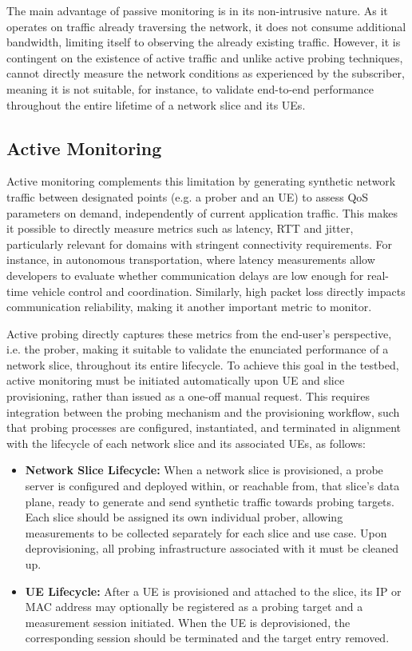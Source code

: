 The main advantage of passive monitoring is in its non-intrusive nature. As it operates on traffic already traversing the network, it does not consume additional bandwidth, limiting itself to observing the already existing traffic. However, it is contingent on the existence of active traffic and unlike active probing techniques, cannot directly measure the network conditions as experienced by the subscriber, meaning it is not suitable, for instance, to validate end-to-end performance throughout the entire lifetime of a network slice and its \acsp{UE}.

\subsection{Active Monitoring}
\label{chap:proposal:observability:activemonitoring}

Active monitoring complements this limitation by generating synthetic network traffic between designated points (e.g. a prober and an \acs{UE}) to assess \acs{QoS} parameters on demand, independently of current application traffic. This makes it possible to directly measure metrics such as latency, \acs{RTT} and jitter, particularly relevant for domains with stringent connectivity requirements. For instance, in autonomous transportation, where latency measurements allow developers to evaluate whether communication delays are low enough for real-time vehicle control and coordination. Similarly, high packet loss directly impacts communication reliability, making it another important metric to monitor.

Active probing directly captures these metrics from the end-user's perspective, i.e. the prober, making it suitable to validate the enunciated performance of a network slice, throughout its entire lifecycle. To achieve this goal in the testbed, active monitoring must be initiated automatically upon \acs{UE} and slice provisioning, rather than issued as a one-off manual request. This requires integration between the probing mechanism and the provisioning workflow, such that probing processes are configured, instantiated, and terminated in alignment with the lifecycle of each network slice and its associated \acsp{UE}, as follows:

\begin{itemize}
    \item \textbf{Network Slice Lifecycle:} When a network slice is provisioned, a probe server is configured and deployed within, or reachable from, that slice's data plane, ready to generate and send synthetic traffic towards probing targets. Each slice should be assigned its own individual prober, allowing measurements to be collected separately for each slice and use case. Upon deprovisioning, all probing infrastructure associated with it must be cleaned up.
    \item \textbf{UE Lifecycle:} After a \acs{UE} is provisioned and attached to the slice, its \acs{IP} or \acs{MAC} address may optionally be registered as a probing target and a measurement session initiated. When the \acs{UE} is deprovisioned, the corresponding session should be terminated and the target entry removed.
\end{itemize}


